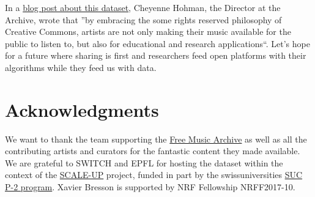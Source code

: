 \documentclass{article}
\begin{document}
In a \href{https://freemusicarchive.org/member/cheyenne_h/blog/FMA_Dataset_for_Researchers}{blog post about this dataset}, Cheyenne Hohman, the Director at the Archive, wrote that ''by embracing the some rights reserved philosophy of Creative Commons, artists are not only making their music available for the public to listen to, but also for educational and research applications``.
Let's hope for a future where sharing is first and researchers feed open platforms with their algorithms while they feed us with data.


\section{Acknowledgments}


We want to thank the team supporting the \href{https://freemusicarchive.org}{Free Music Archive} as well as all the contributing artists and curators for the fantastic content they made available.
We are grateful to SWITCH and EPFL for hosting the dataset within the context of the \href{https://projects.switch.ch/scale-up}{SCALE-UP} project, funded in part by the swissuniversities \href{http://www.swissuniversities.ch/isci}{SUC P-2 program}.
Xavier Bresson is supported by NRF Fellowship NRFF2017-10.


\end{document}
